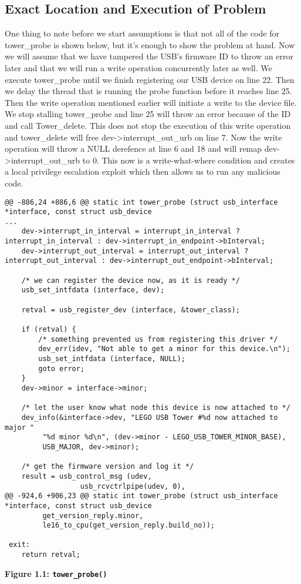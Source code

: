 \documentclass[12pt]{article}
\begin{document}
\subsection{Exact Location and Execution of Problem}
One thing to note before we start assumptions is that not all of the code for tower\_probe is shown below, but it's enough to show the problem at hand. Now we will assume that we have tampered the USB's firmware ID to throw an error later and that we will run a write operation concurrently later as well. We execute tower\_probe until we finish registering our USB device on line 22. Then we delay the thread that is running the probe function before it reaches line 25. Then the write operation mentioned earlier will initiate a write to the device file. We stop stalling tower\_probe and line 25 will throw an error because of the ID and call Tower\_delete. This does not stop the execution of this write operation and tower\_delete will free dev->interrupt\_out\_urb on line 7. Now the write operation will throw a NULL derefence at line 6 and 18 and will remap dev->interrupt\_out\_urb to 0. This now is a write-what-where condition and creates a local privilege escalation exploit which then allows us to run any malicious code.
\begin{lstlisting}[style=CStyle]
@@ -886,24 +886,6 @@ static int tower_probe (struct usb_interface *interface, const struct usb_device
...
 	dev->interrupt_in_interval = interrupt_in_interval ? interrupt_in_interval : dev->interrupt_in_endpoint->bInterval;
 	dev->interrupt_out_interval = interrupt_out_interval ? interrupt_out_interval : dev->interrupt_out_endpoint->bInterval;
 
	/* we can register the device now, as it is ready */
	usb_set_intfdata (interface, dev);

	retval = usb_register_dev (interface, &tower_class);

	if (retval) {
		/* something prevented us from registering this driver */
		dev_err(idev, "Not able to get a minor for this device.\n");
		usb_set_intfdata (interface, NULL);
		goto error;
	}
	dev->minor = interface->minor;

	/* let the user know what node this device is now attached to */
	dev_info(&interface->dev, "LEGO USB Tower #%d now attached to major "
		 "%d minor %d\n", (dev->minor - LEGO_USB_TOWER_MINOR_BASE),
		 USB_MAJOR, dev->minor);

 	/* get the firmware version and log it */
 	result = usb_control_msg (udev,
 				  usb_rcvctrlpipe(udev, 0),
@@ -924,6 +906,23 @@ static int tower_probe (struct usb_interface *interface, const struct usb_device
 		 get_version_reply.minor,
 		 le16_to_cpu(get_version_reply.build_no));
 
 exit:
 	return retval;
\end{lstlisting}
\centerline{\textbf{Figure 1.1: \texttt{tower\_probe()}}}
\vspace{12pt}
\end{document}
